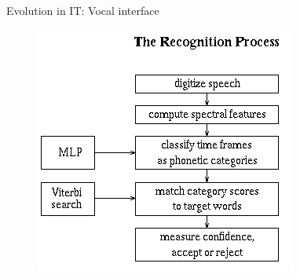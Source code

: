 \documentclass{beamer}
\begin{document}
\begin{frame}{Evolution in IT: Vocal interface}
\begin{figure}[ht]
\begin{minipage}[b]{0.30\linewidth}
\end{minipage}
\hspace{0.15cm}
\begin{minipage}[b]{0.40\linewidth}
\centering
\includegraphics[width=\textwidth]{recognition-process.png}


\end{minipage}
\end{figure}
\end{frame}
\end{document}
